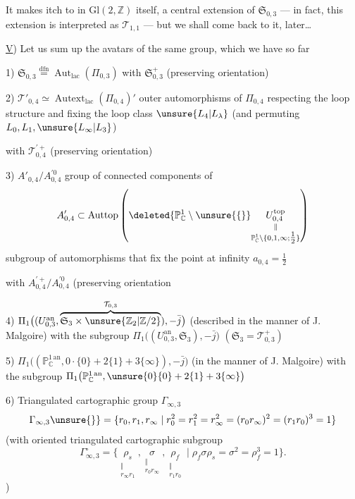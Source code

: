 
It makes  itch to 
in $\mathrm{Gl}(2,\mathbb Z)$ itself, a central extension of
$\mathfrak S_{0,3}$ --- in fact, this extension is interpreted as
$\mathcal{T}_{1,1}$ --- but we shall come back to it, later\ldots

\uline{V}) Let us sum up the avatars of the same group, which we have
 so far

1) $\mathfrak S_{0,3}\overset{\text{dfn}}{=}\operatorname{Aut}_{\mathrm{lac}}(\Pi_{0,3})$
with  $\mathfrak S_{0,3}^{+}$ (preserving orientation)

2) $\mathcal{T}'_{0,4}\simeq\operatorname{Autext}_{\mathrm{lac}}(\Pi_{0,4})'$
outer automorphisms of $\Pi_{0,4}$ respecting the loop structure and fixing the loop class
$\unsure{L_4|L_\lambda}$ (and permuting $L_0,L_1,\unsure{L_\infty|L_3}$)

with $\mathcal{T}_{0,4}^{\prime+}$ (preserving orientation)

3) $A'_{0,4}/A_{0,4}^{\prime0}$ group of connected components of
\[
A'_{0,4}\subset\operatorname{Auttop}
\left(\deleted{\mathbb P^1_{\mathbb C}\setminus\unsure{\{}}
\underset{\substack{\Vert\\\mathbb P^1_{\mathbb C}\setminus\{0,1,\infty;\tfrac12\}}}{U_{0,4}^{\mathrm{top}}}\right)
\]
subgroup of automorphisms that fix the point at infinity $a_{0,4}=\tfrac12$

with $A_{0,4}^{\prime+}/A_{0,4}^{\prime0}$ (preserving orientation

4) $\Pi_1\bigl((U_{0,3}^{\mathrm{an}},\overbrace{\mathfrak S_3\times\unsure{\mathbb Z_2|\mathbb Z/2}}^{\mathcal{T}_{0,3}}),-\bar j\bigr)$
(described in the manner of J. Malgoire)
with the subgroup $\Pi_1\bigl((U_{0,3}^{\mathrm{an}},\mathfrak S_3),-\bar j\bigr)$
$(\mathfrak S_3=\mathcal{T}_{0,3}^{+})$

5) $\Pi_1\bigl((\mathbb P^{1\,\mathrm{an}}_{\mathbb C},0\cdot\{0\}+2\{1\}+3\{\infty\}),-\bar j\bigr)$
(in the manner of J. Malgoire)
with the subgroup $\Pi_1\bigl(\mathbb P^{1\,\mathrm{an}}_{\mathbb C},\unsure{0}\{0\}+2\{1\}+3\{\infty\}\bigr)$

6) Triangulated cartographic group  $\Gamma_{\infty,3}$
\[
\Gamma_{\infty,3}\unsure{\}}=\{r_0,r_1,r_\infty\mid
r_0^2=r_1^2=r_\infty^2=(r_0r_\infty)^2=(r_1r_0)^3=1\}
\]
(with oriented triangulated cartographic subgroup
\[
\Gamma_{\infty,3}^{\circ}=\{
\underset{\substack{\Vert\\r_\infty r_1}}{\rho_s},
\underset{\substack{\Vert\\r_0r_\infty}}{\sigma},
\underset{\substack{\Vert\\r_1r_0}}{\rho_f}
\mid\rho_f\sigma\rho_s=\sigma^2=\rho_f^3=1\}.
\]
)

